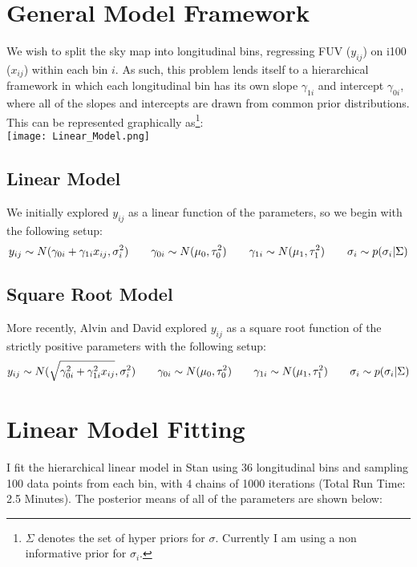 \documentclass[12pt]{article}
\begin{document}

\def\ci{\perp\!\!\!\perp}
\def\ex{\mathbb{E}}
\def\prob{\mathbb{P}}
\def\ind{\mathbb{I}}
\def\grad{\triangledown}
\def\bigo{\mathcal{O}}

\section*{General Model Framework}
We wish to split the sky map into longitudinal bins, regressing FUV ($y_{ij}$) on i100 ($x_{ij}$) within each bin $i$. As such, this problem lends itself to a hierarchical framework in which each longitudinal bin has its own slope $\gamma_{1i}$ and intercept $\gamma_{0i}$, where all of the slopes and intercepts are drawn from common prior distributions. This can be represented graphically as\footnote{$\Sigma$ denotes the set of hyper priors for $\sigma$. Currently I am using a non informative prior for $\sigma_i$.}:\\

\indent\indent\indent\indent\indent\indent\indent\indent \texttt{[image: Linear\_Model.png]}

\subsection*{Linear Model}
We initially explored $y_{ij}$ as a linear function of the parameters, so we begin with the following setup:
$$y_{ij} \sim N( \gamma_{0i} + \gamma_{1i}x_{ij} , \sigma_i^2)
\hspace{20 pt} \gamma_{0i} \sim N(\mu_0,\tau_0^2)
\hspace{20 pt} \gamma_{1i} \sim N(\mu_1,\tau_1^2)
\hspace{20 pt} \sigma_i \sim p(\sigma_i|\Sigma)$$

\subsection*{Square Root Model}
More recently, Alvin and David explored $y_{ij}$ as a square root function of the strictly positive parameters with the following setup:
$$y_{ij} \sim N( \sqrt{ \gamma_{0i}^2 + \gamma_{1i}^2 x_{ij}} , \sigma_i^2)
\hspace{20 pt} \gamma_{0i} \sim N(\mu_0,\tau_0^2)
\hspace{20 pt} \gamma_{1i} \sim N(\mu_1,\tau_1^2)
\hspace{20 pt} \sigma_i \sim p(\sigma_i|\Sigma)$$

\pagebreak
\section*{Linear Model Fitting}
I fit the hierarchical linear model in Stan using 36 longitudinal bins and sampling 100 data points from each bin, with 4 chains of 1000 iterations (Total Run Time: 2.5 Minutes).  The posterior means of all of the parameters are shown below:
\end{document}
